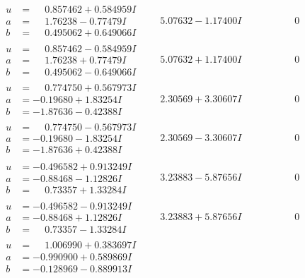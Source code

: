 \documentclass[1p]{elsarticle_modified}
\theoremstyle{definition}
\begin{document}
$$\begin{array}{c|c|c}
\begin{aligned}
u &= \phantom{-}0.857462 + 0.584959 I \\
a &= \phantom{-}1.76238 - 0.77479 I \\
b &= \phantom{-}0.495062 + 0.649066 I\end{aligned}
 & \phantom{-}5.07632 - 1.17400 I & \phantom{-0.000000 } 0 \\ \hline\begin{aligned}
u &= \phantom{-}0.857462 - 0.584959 I \\
a &= \phantom{-}1.76238 + 0.77479 I \\
b &= \phantom{-}0.495062 - 0.649066 I\end{aligned}
 & \phantom{-}5.07632 + 1.17400 I & \phantom{-0.000000 } 0 \\ \hline\begin{aligned}
u &= \phantom{-}0.774750 + 0.567973 I \\
a &= -0.19680 + 1.83254 I \\
b &= -1.87636 - 0.42388 I\end{aligned}
 & \phantom{-}2.30569 + 3.30607 I & \phantom{-0.000000 } 0 \\ \hline\begin{aligned}
u &= \phantom{-}0.774750 - 0.567973 I \\
a &= -0.19680 - 1.83254 I \\
b &= -1.87636 + 0.42388 I\end{aligned}
 & \phantom{-}2.30569 - 3.30607 I & \phantom{-0.000000 } 0 \\ \hline\begin{aligned}
u &= -0.496582 + 0.913249 I \\
a &= -0.88468 - 1.12826 I \\
b &= \phantom{-}0.73357 + 1.33284 I\end{aligned}
 & \phantom{-}3.23883 - 5.87656 I & \phantom{-0.000000 } 0 \\ \hline\begin{aligned}
u &= -0.496582 - 0.913249 I \\
a &= -0.88468 + 1.12826 I \\
b &= \phantom{-}0.73357 - 1.33284 I\end{aligned}
 & \phantom{-}3.23883 + 5.87656 I & \phantom{-0.000000 } 0 \\ \hline\begin{aligned}
u &= \phantom{-}1.006990 + 0.383697 I \\
a &= -0.990900 + 0.589869 I \\
b &= -0.128969 - 0.889913 I\end{aligned}

\end{array}$$
\end{document}
